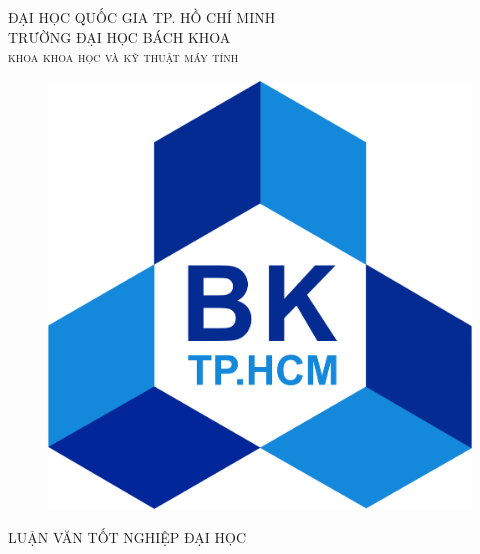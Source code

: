 \documentclass[a4paper, 12pt]{article}
\theoremstyle{definition}
\begin{document}
\begin{titlepage}

\newcommand{\HRule}{\rule{\linewidth}{0.5mm}} %

\center %
 

\textsc{\large ĐẠI HỌC QUỐC GIA TP. HỒ CHÍ MINH}\\ [0.2cm]
\textsc{\large TRƯỜNG ĐẠI HỌC BÁCH KHOA}\\[0.3cm] %
\textsc{\Large \scshape khoa khoa học và kỹ thuật máy tính}\\[0.5cm] %
\begin{figure}[H] 
\centering
\includegraphics[scale=0.4]{hinh/HCMUT_official_logo.png}
\end{figure} 

\textsc{\large LUẬN VĂN TỐT NGHIỆP ĐẠI HỌC}\\[0.2cm] %



\end{titlepage}
\end{document}
